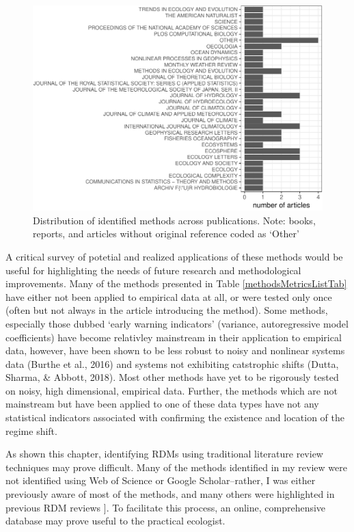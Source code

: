 \documentclass[12pt,twoside,openany]{reedthesis}
\begin{document}
\begin{figure}
\centering
\includegraphics{_myDissertation_files/figure-latex/jrnlDistFig-1.pdf}
\caption{\label{fig:jrnlDistFig}Distribution of identified methods across
publications. Note: books, reports, and articles without original
reference coded as `Other'}
\end{figure}
A critical survey of potetial and realized applications of these methods
would be useful for highlighting the needs of future research and
methodological improvements. Many of the methods presented in Table
\ref{methodsMetricsListTab} have either not been applied to empirical
data at all, or were tested only once (often but not always in the
article introducing the method). Some methods, especially those dubbed
`early warning indicators' (variance, autoregressive model coefficients)
have become relativley mainstream in their application to empirical
data, however, have been shown to be less robust to noisy and nonlinear
systems data (Burthe et al., 2016) and systems not exhibiting
catstrophic shifts (Dutta, Sharma, \& Abbott, 2018). Most other methods
have yet to be rigorously tested on noisy, high dimensional, empirical
data. Further, the methods which are not mainstream but have been
applied to one of these data types have not any statistical indicators
associated with confirming the existence and location of the regime
shift.

As shown this chapter, identifying RDMs using traditional literature
review techniques may prove difficult. Many of the methods identified in
my review were not identified using Web of Science or Google
Scholar--rather, I was either previously aware of most of the methods,
and many others were highlighted in previous RDM reviews {]}. To
facilitate this process, an online, comprehensive database may prove
useful to the practical ecologist.
\end{document}
